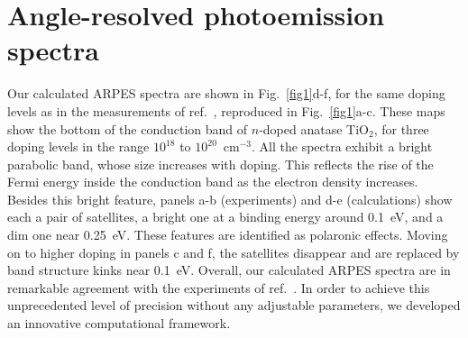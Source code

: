 \documentclass[12pt]{nature}
\begin{document}
\section*{\textsf{\small Angle-resolved photoemission spectra}}

Our calculated ARPES spectra are shown in Fig.~\ref{fig1}\mbox{d-f}, for the same doping levels as in the 
measurements of ref.~, reproduced in Fig.~\ref{fig1}a-c. These maps show the bottom 
of the conduction band of \mbox{$n$-doped} anatase TiO$_2$, for three doping levels in the range 
$10^{18}$ to $10^{20}$~cm$^{-3}$. All the spectra exhibit a bright parabolic band, whose
size increases with doping. This reflects the rise of the Fermi energy inside the conduction band 
as the electron density increases. Besides this bright feature, panels a-b (experiments) and d-e
(calculations) show each a pair of satellites, a bright one at a binding energy around 0.1~eV, and
a dim one near 0.25~eV. These features are identified as polaronic effects\cite{Moser2013}. Moving on 
to higher doping in panels c and f, the satellites disappear and are replaced by band structure kinks
near 0.1~eV. Overall, our calculated ARPES spectra are in remarkable agreement with the experiments 
of ref.~. In order to achieve this unprecedented level of precision without any 
adjustable parameters, we developed an innovative computational framework.
\end{document}
